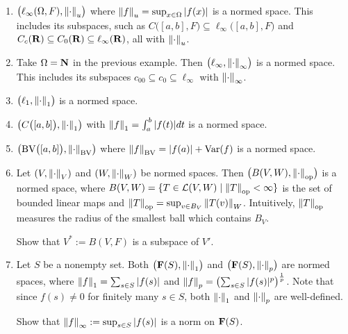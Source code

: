     \begin{example}
        \phantom{a}
        \begin{enumerate}[label = (\arabic*),itemsep=1pt,topsep=3pt]
            \item $\bigl(\ell_\infty(\Omega,F), \left\lVert \cdot \right\rVert_u\bigr)$ where $\left\lVert f \right\rVert_u = \sup_{x \in \Omega}|f(x)|$ is a normed space. This includes its subspaces, such as $C \bigl([a,b],F\bigr) \subseteq \ell_\infty \bigl([a,b],F \bigr)$ and $C_c(\mathbf{R}) \subseteq C_0(\mathbf{R}) \subseteq \ell_\infty(\mathbf{R})$, all with $\left\lVert \cdot \right\rVert_u$.
            \item Take $\Omega = \mathbf{N}$ in the previous example. Then $\bigl(\ell_\infty, \left\lVert \cdot \right\rVert_\infty\bigr)$ is a normed space. This includes its subspaces $c_{00} \subseteq c_0 \subseteq \ell_\infty$ with $\left\lVert \cdot \right\rVert_\infty$.
            \item $\bigl(\ell_1,\left\lVert \cdot \right\rVert_1\bigr)$ is a normed space.
            \item $\bigl(C\bigl([a,b]\bigr), \left\lVert \cdot \right\rVert_1\bigr)$ with $\left\lVert f \right\rVert_1 = \int_a^b |f(t)|dt$ is a normed space.
            \item $\bigl( \text{BV}\bigl([a,b]\bigr), \left\lVert \cdot \right\rVert_{\text{BV}}\bigr)$ where $\left\lVert f \right\rVert_{\text{BV}} = |f(a)| + \text{Var}(f)$ is a normed space.
            \item Let $(V,\left\lVert \cdot \right\rVert_V)$ and $(W,\left\lVert \cdot \right\rVert_W)$ be normed spaces. Then $\bigl(B(V,W),\left\lVert \cdot \right\rVert_\text{op}\bigr)$ is a normed space, where $B(V,W) = \{T \in \mathcal{L}(V,W) \mid \left\lVert T \right\rVert_\text{op} < \infty\}$ is the set of bounded linear maps and $\left\lVert T \right\rVert_\text{op} = \sup_{v \in B_V}\left\lVert T(v) \right\rVert_W$. Intuitively, $\left\lVert T \right\rVert_\text{op}$ measures the radius of the smallest ball which contains $B_V$.
                \begin{exercise}
                    Show that $V^\ast := B(V,F)$ is a subspace of $V'$.
                \end{exercise}
            \item Let $S$ be a nonempty set. Both $\bigl( \mathbf{F}(S),\left\lVert \cdot \right\rVert_1\bigr)$ and $\bigl( \mathbf{F}(S),\left\lVert \cdot \right\rVert_p\bigr)$ are normed spaces, where $\left\lVert f \right\rVert_1 = \sum_{s \in S}|f(s)|$ and $\left\lVert f \right\rVert_p = \left( \sum_{s \in S}|f(s)|^p \right)^\frac{1}{p}$. Note that since $f(s) \neq 0$ for finitely many $s \in S$, both $\left\lVert \cdot \right\rVert_1$ and $\left\lVert \cdot \right\rVert_p$ are well-defined.
                \begin{exercise}
                    Show that $\left\lVert f \right\rVert_\infty := \sup_{s \in S}|f(s)|$ is a norm on $\mathbf{F}(S)$.
                \end{exercise}
        \end{enumerate}
    \end{example}
\newpage
